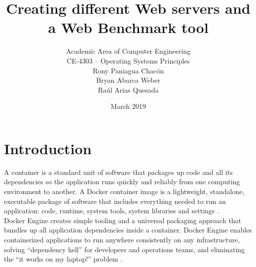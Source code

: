 \documentclass{article}
\title{Creating different Web servers and a Web Benchmark tool}
\author{
Academic Area of Computer Engineering\\
CE-4303 – Operating Systems Principles\\
Rony Paniagua Chacón\\
Bryan Abarca Weber\\
Raúl Arias Quesada}
\date{March 2019}
\begin{document}
\maketitle

\section{Introduction}
A container is a standard unit of software that packages up code and all its dependencies so the application runs quickly and reliably from one computing environment to another. A Docker container image is a lightweight, standalone, executable package of software that includes everything needed to run an application: code, runtime, system tools, system libraries and settings \cite{WhatDocker}.\\
Docker Engine creates simple tooling and a universal packaging approach that bundles up all application dependencies inside a container. Docker Engine enables containerized applications to run anywhere consistently on any infrastructure, solving “dependency hell” for developers and operations teams, and eliminating the “it works on my laptop!” problem \cite{DockerEngine}.
\end{document}
